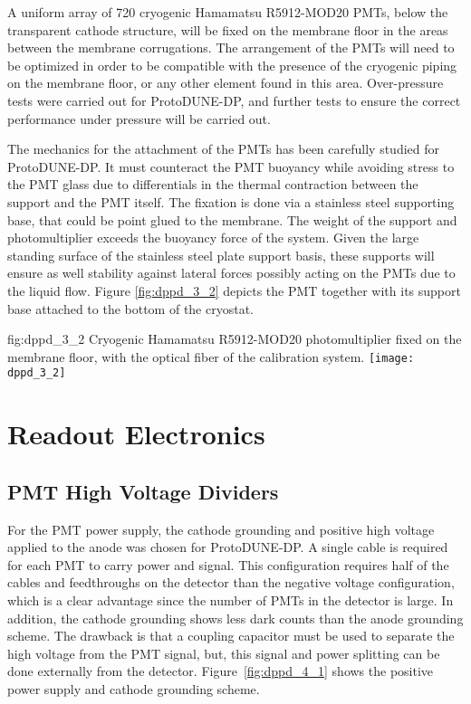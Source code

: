 A uniform array of \num{720} cryogenic Hamamatsu R5912-MOD20 PMTs, below the transparent cathode structure, will be fixed on the membrane floor in the areas between the membrane corrugations. The arrangement of the PMTs will need to be optimized in order to be compatible with the presence of the cryogenic piping on the membrane floor, or any other element found in this area. Over-pressure tests were carried out for ProtoDUNE-DP, and further tests to ensure the correct performance under pressure will be carried out.

The mechanics for the attachment of the PMTs has been carefully studied for ProtoDUNE-DP. It must counteract the PMT buoyancy while avoiding stress to the PMT glass due to differentials in the thermal contraction between the support and the PMT itself. The fixation is done via a stainless steel supporting base, that could be point glued to the membrane. The weight of the support and photomultiplier exceeds the buoyancy force of the system. Given the large standing surface of the stainless steel plate support basis, these supports will ensure as well stability against lateral forces possibly acting on the PMTs due to the liquid flow. Figure \ref{fig:dppd_3_2} depicts the PMT together with its support base attached to the bottom of the cryostat.

\begin{dunefigure}{fig:dppd_3_2}
{Cryogenic Hamamatsu R5912-MOD20 photomultiplier fixed on the membrane floor, with the optical fiber of the calibration system.}
\texttt{[image: dppd\_3\_2]}
\end{dunefigure}

\section{Readout Electronics}
\label{sec:fddp-pd-4}

\subsection{PMT High Voltage Dividers}
\label{sec:fddp-pd-4.1}

For the PMT power supply, the cathode grounding and positive high voltage applied to the anode was chosen for ProtoDUNE-DP. A single cable is required for each PMT to carry power and signal. This configuration requires half of the cables and feedthroughs on the detector than the negative voltage configuration, which is a clear advantage since the number of PMTs in the detector is large. In addition, the cathode grounding shows less dark counts than the anode grounding scheme. The drawback is that a coupling capacitor must be used to separate the high voltage from the PMT signal, but, this signal and power splitting can be done externally from the detector. Figure~\ref{fig:dppd_4_1} shows the positive power supply and cathode grounding scheme.

